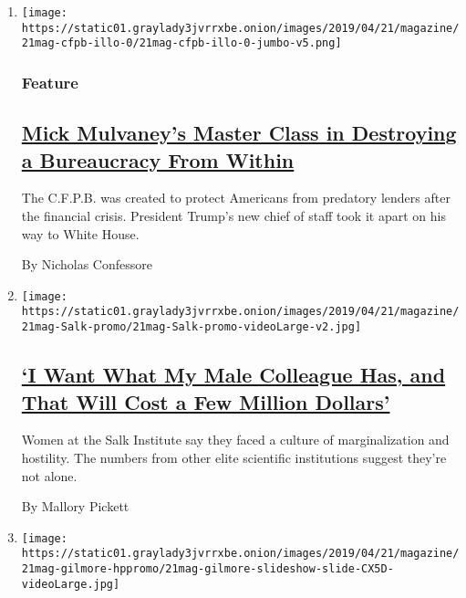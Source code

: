 \begin{enumerate}
\def\labelenumi{\arabic{enumi}.}
\item
  \texttt{[image: https://static01.graylady3jvrrxbe.onion/images/2019/04/21/magazine/21mag-cfpb-illo-0/21mag-cfpb-illo-0-jumbo-v5.png]}

  \hypertarget{feature}{%
  \subsubsection{Feature}\label{feature}}

  \hypertarget{mick-mulvaneys-master-class-in-destroying-a-bureaucracy-from-within}{%
  \subsection{\texorpdfstring{\href{/2019/04/16/magazine/consumer-financial-protection-bureau-trump.html}{Mick
  Mulvaney's Master Class in Destroying a Bureaucracy From
  Within}}{Mick Mulvaney's Master Class in Destroying a Bureaucracy From Within}}\label{mick-mulvaneys-master-class-in-destroying-a-bureaucracy-from-within}}

  The C.F.P.B. was created to protect Americans from predatory lenders
  after the financial crisis. President Trump's new chief of staff took
  it apart on his way to White House.

  By Nicholas Confessore
\item
  \texttt{[image: https://static01.graylady3jvrrxbe.onion/images/2019/04/21/magazine/21mag-Salk-promo/21mag-Salk-promo-videoLarge-v2.jpg]}

  \hypertarget{i-want-what-my-male-colleague-has-and-that-will-cost-a-few-million-dollars}{%
  \subsection{\texorpdfstring{\href{/2019/04/18/magazine/salk-institute-discrimination-science.html}{`I
  Want What My Male Colleague Has, and That Will Cost a Few Million
  Dollars'}}{`I Want What My Male Colleague Has, and That Will Cost a Few Million Dollars'}}\label{i-want-what-my-male-colleague-has-and-that-will-cost-a-few-million-dollars}}

  Women at the Salk Institute say they faced a culture of
  marginalization and hostility. The numbers from other elite scientific
  institutions suggest they're not alone.

  By Mallory Pickett
\item
  \texttt{[image: https://static01.graylady3jvrrxbe.onion/images/2019/04/21/magazine/21mag-gilmore-hppromo/21mag-gilmore-slideshow-slide-CX5D-videoLarge.jpg]}


\end{enumerate}

